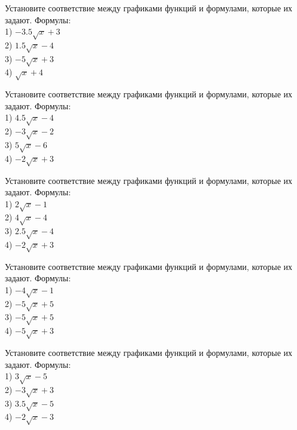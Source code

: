 \documentclass[4apaper]{article}
\begin{document}
\begin{taskBN}{1}
Установите соответствие между графиками функций и формулами, которые их задают. Формулы: \\1) $-3.5\sqrt{x}+3$\\2) $1.5\sqrt{x}-4$\\3) $-5\sqrt{x}+3$\\4) $\sqrt{x}+4$
\end{taskBN}

\begin{taskBN}{2}
Установите соответствие между графиками функций и формулами, которые их задают. Формулы: \\1) $4.5\sqrt{x}-4$\\2) $-3\sqrt{x}-2$\\3) $5\sqrt{x}-6$\\4) $-2\sqrt{x}+3$
\end{taskBN}

\begin{taskBN}{3}
Установите соответствие между графиками функций и формулами, которые их задают. Формулы: \\1) $2\sqrt{x}-1$\\2) $4\sqrt{x}-4$\\3) $2.5\sqrt{x}-4$\\4) $-2\sqrt{x}+3$
\end{taskBN}

\begin{taskBN}{4}
Установите соответствие между графиками функций и формулами, которые их задают. Формулы: \\1) $-4\sqrt{x}-1$\\2) $-5\sqrt{x}+5$\\3) $-5\sqrt{x}+5$\\4) $-5\sqrt{x}+3$
\end{taskBN}

\begin{taskBN}{5}
Установите соответствие между графиками функций и формулами, которые их задают. Формулы: \\1) $3\sqrt{x}-5$\\2) $-3\sqrt{x}+3$\\3) $3.5\sqrt{x}-5$\\4) $-2\sqrt{x}-3$
\end{taskBN}
\end{document}
